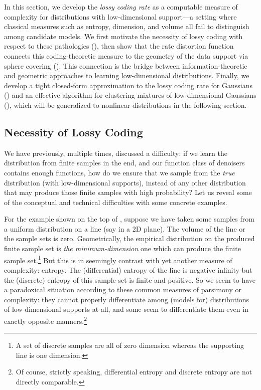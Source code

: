 \documentclass[../../book-main.tex]{subfiles}
\begin{document}
In this section, we develop the \textit{lossy coding rate}
as a computable measure of complexity for distributions with
low-dimensional support---a setting where classical measures such as
entropy, dimension, and volume all fail to distinguish among candidate
models. We first motivate the necessity of lossy coding with respect to these
pathologies
(), then show that the rate distortion function
connects this coding-theoretic measure to the geometry of the data
support via sphere covering ().
This connection is the bridge between information-theoretic and geometric
approaches to learning low-dimensional distributions. Finally, we develop
a tight closed-form approximation to the lossy coding rate for Gaussians
() and an effective algorithm for clustering mixtures of
low-dimensional Gaussians (), which will be
generalized to nonlinear distributions in the following section.

\subsection{Necessity of Lossy Coding}\label{sub:rate-dist}

We have previously, multiple times, discussed a difficulty: if we
learn the distribution from finite samples in the end, and our
function class of denoisers contains enough functions, how do we
ensure that we sample from the \textit{true} distribution (with
low-dimensional supports), instead of any other distribution that may
produce those finite samples with high probability? Let us reveal
some of the conceptual and technical difficulties with some concrete examples.

\begin{example}\label{eg:measures-of-complexity}
    For the example shown on the top of , suppose
    we have taken some samples from a uniform distribution on a line
    (say in a 2D plane). The volume of the line or the sample sets is zero.
    Geometrically, the empirical distribution on the produced finite
    sample set is {\em the minimum-dimension} one which can produce
    the finite sample set.\footnote{A set of discrete samples are all
    of zero dimension whereas the supporting line is one dimension.}
    But this is in seemingly contrast with yet another measure of
    complexity: entropy. The (differential) entropy of the line is
    negative infinity but the (discrete) entropy of this sample set
    is finite and positive. So we seem to have a paradoxical
    situation according to these common measures of parsimony or
    complexity: they cannot properly differentiate among (models for)
    distributions of low-dimensional supports at all, and some seem
    to differentiate them even in exactly opposite
    manners.\footnote{Of course, strictly speaking, differential
    entropy and discrete entropy are not directly comparable.}
\end{example}
\end{document}
